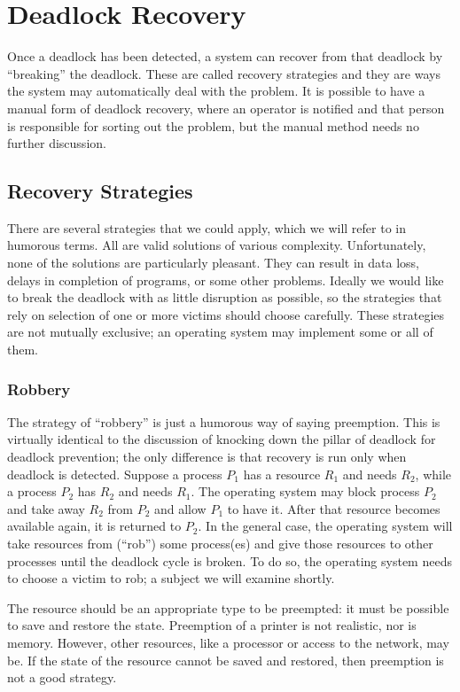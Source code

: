 \section*{Deadlock Recovery}
Once a deadlock has been detected, a system can recover from that deadlock by ``breaking'' the deadlock. These are called recovery strategies and they are ways the system may automatically deal with the problem. It is possible to have a manual form of deadlock recovery, where an operator is notified and that person is responsible for sorting out the problem, but the manual method needs no further discussion.

\subsection*{Recovery Strategies}
There are several strategies that we could apply, which we will refer to in humorous terms. All are valid solutions of various complexity. Unfortunately, none of the solutions are particularly pleasant. They can result in data loss, delays in completion of programs, or some other problems.  Ideally we would like to break the deadlock with as little disruption as possible, so the strategies that rely on selection of one or more victims should choose carefully. These strategies are not mutually exclusive; an operating system may implement some or all of them.


\subsubsection*{Robbery}
The strategy of ``robbery'' is just a humorous way of saying preemption. This is virtually identical to the discussion of knocking down the pillar of deadlock for deadlock prevention; the only difference is that recovery is run only when deadlock is detected. Suppose a process $P_{1}$ has a resource $R_{1}$ and needs $R_{2}$, while a process $P_{2}$ has $R_{2}$ and needs $R_{1}$. The operating system may block process $P_{2}$ and take away $R_{2}$ from $P_{2}$ and allow $P_{1}$ to have it. After that resource becomes available again, it is returned to $P_{2}$. In the general case, the operating system will take resources from (``rob'') some process(es) and give those resources to other processes until the deadlock cycle is broken. To do so, the operating system needs to choose a victim to rob; a subject we will examine shortly.

The resource should be an appropriate type to be preempted: it must be possible to save and restore the state. Preemption of a printer is not realistic, nor is memory. However, other resources, like a processor or access to the network, may be. If the state of the resource cannot be saved and restored, then preemption is not a good strategy. 


